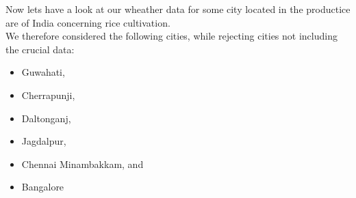 \documentclass[10pt]{beamer}
\begin{document}
\begin{frame}
	Now lets have a look at our wheather data for some city located in the productice are of India concerning rice cultivation. \\
	We therefore considered the following cities, while rejecting cities not including the crucial data:
	\begin{itemize}
		\item Guwahati,
		\item Cherrapunji,
		\item Daltonganj,
		\item Jagdalpur,
		\item Chennai Minambakkam, and
		\item Bangalore
	\end{itemize}
\end{frame}
\end{document}

